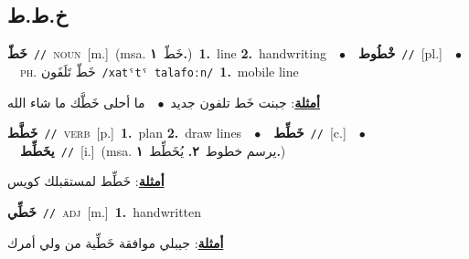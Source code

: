 \documentclass[10pt,a4paper,twoside]{article} %
\begin{document}
\begin{multicols}{2}
\vspace{-3mm}
\subsection*{\color{blue}\foreignlanguage{arabic}{خ.ط.ط}\color{blue}{}} 

{\setlength\topsep{0pt}\textbf{\foreignlanguage{arabic}{خَطّ}}\ {\color{gray}\texttt{//}\color{black}}\ \textsc{noun}\ [m.]\ \color{gray}(msa. \foreignlanguage{arabic}{خَطّ}~\foreignlanguage{arabic}{\textbf{١.}})\color{black}\ \textbf{1.}~line  \textbf{2.}~handwriting\ \ $\bullet$\ \ \setlength\topsep{0pt}\textbf{\foreignlanguage{arabic}{خْطُوط}}\ {\color{gray}\texttt{//}\color{black}}\ [pl.]\ \ $\bullet$\ \ \textsc{ph.} \color{gray} \foreignlanguage{arabic}{خَطّ تَلَفَون}\color{black}\ {\color{gray}\texttt{/{\sffamily xatˤtˤ talafoːn}/}\color{black}}\ \textbf{1.}~mobile line\  \begin{flushright}\color{gray}\foreignlanguage{arabic}{\textbf{\underline{\foreignlanguage{arabic}{أمثلة}}}: جبنت خَط تلفون جديد\ $\bullet$\ \  ما أحلى خَطَّك ما شاء الله}\end{flushright}\color{black}} \vspace{2mm}

{\setlength\topsep{0pt}\textbf{\foreignlanguage{arabic}{خَطَّط}}\ {\color{gray}\texttt{//}\color{black}}\ \textsc{verb}\ [p.]\ \textbf{1.}~plan  \textbf{2.}~draw lines\ \ $\bullet$\ \ \setlength\topsep{0pt}\textbf{\foreignlanguage{arabic}{خَطِّط}}\ {\color{gray}\texttt{//}\color{black}}\ [c.]\ \ $\bullet$\ \ \setlength\topsep{0pt}\textbf{\foreignlanguage{arabic}{يخَطِّط}}\ {\color{gray}\texttt{//}\color{black}}\ [i.]\ \color{gray}(msa. \foreignlanguage{arabic}{يرسم خطوط}~\foreignlanguage{arabic}{\textbf{٢.}}  \foreignlanguage{arabic}{يُخَطِّط}~\foreignlanguage{arabic}{\textbf{١.}})\color{black}\  \begin{flushright}\color{gray}\foreignlanguage{arabic}{\textbf{\underline{\foreignlanguage{arabic}{أمثلة}}}: خَطِّط لمستقبلك كويس}\end{flushright}\color{black}} \vspace{2mm}

{\setlength\topsep{0pt}\textbf{\foreignlanguage{arabic}{خَطِّي}}\ {\color{gray}\texttt{//}\color{black}}\ \textsc{adj}\ [m.]\ \textbf{1.}~handwritten\  \begin{flushright}\color{gray}\foreignlanguage{arabic}{\textbf{\underline{\foreignlanguage{arabic}{أمثلة}}}: جيبلي موافقة خَطِّية من ولي أمرك}\end{flushright}\color{black}} \vspace{2mm}


\end{multicols}
\end{document}
